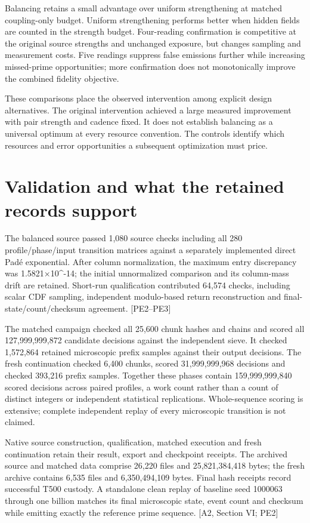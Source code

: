 Balancing retains a small advantage over uniform strengthening at matched coupling-only budget. Uniform strengthening performs better when hidden fields are counted in the strength budget. Four-reading confirmation is competitive at the original source strengths and unchanged exposure, but changes sampling and measurement costs. Five readings suppress false emissions further while increasing missed-prime opportunities; more confirmation does not monotonically improve the combined fidelity objective.

These comparisons place the observed intervention among explicit design alternatives. The original intervention achieved a large measured improvement with pair strength and cadence fixed. It does not establish balancing as a universal optimum at every resource convention. The controls identify which resources and error opportunities a subsequent optimization must price.

\section{Validation and what the retained records support}\label{validation-and-what-the-retained-records-support}

The balanced source passed 1,080 source checks including all 280 profile/phase/input transition matrices against a separately implemented direct Padé exponential. After column normalization, the maximum entry discrepancy was 1.5821×10\^{}-14; the initial unnormalized comparison and its column-mass drift are retained. Short-run qualification contributed 64,574 checks, including scalar CDF sampling, independent modulo-based return reconstruction and final-state/count/checksum agreement. {[}PE2--PE3{]}

The matched campaign checked all 25,600 chunk hashes and chains and scored all 127,999,999,872 candidate decisions against the independent sieve. It checked 1,572,864 retained microscopic prefix samples against their output decisions. The fresh continuation checked 6,400 chunks, scored 31,999,999,968 decisions and checked 393,216 prefix samples. Together these phases contain 159,999,999,840 scored decisions across paired profiles, a work count rather than a count of distinct integers or independent statistical replications. Whole-sequence scoring is extensive; complete independent replay of every microscopic transition is not claimed.

Native source construction, qualification, matched execution and fresh continuation retain their result, export and checkpoint receipts. The archived source and matched data comprise 26,220 files and 25,821,384,418 bytes; the fresh archive contains 6,535 files and 6,350,494,109 bytes. Final hash receipts record successful T500 custody. A standalone clean replay of baseline seed 1000063 through one billion matches its final microscopic state, event count and checksum while emitting exactly the reference prime sequence. {[}A2, Section VI; PE2{]}

